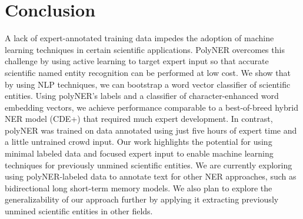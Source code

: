 \section{Conclusion}
\label{sect:apner_conclusion}
A lack of expert-annotated training data impedes the adoption of machine learning techniques in certain scientific applications.
PolyNER overcomes this challenge by 
using active learning to target 
expert input so that accurate scientific named entity recognition can be performed at low cost.
We show that by using NLP techniques, we can bootstrap a word vector classifier of scientific entities.
Using polyNER's labels and a classifier of character-enhanced word embedding vectors, we achieve 
performance comparable to a best-of-breed
hybrid NER model (CDE+) that required much expert development.
In contrast, polyNER was trained on data annotated using just five hours of expert time and a little untrained crowd input.
Our work highlights the potential for using minimal labeled data %
and focused expert input to enable machine learning techniques for previously unmined scientific entities. 
We are currently exploring using polyNER-labeled data to annotate text for other NER approaches,
such as bidirectional long short-term memory models.
We also plan to explore the generalizability of our approach further by applying it extracting previously unmined scientific entities in other fields.
